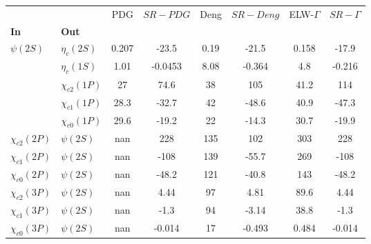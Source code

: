 \begin{tabular}{l|l|c|c|c|c|c|c}
\toprule
                &            &   PDG & $SR-PDG$ &  Deng & $SR-Deng$ &  ELW-$\Gamma$ & $SR-\Gamma$ \\
\textbf{In} & \textbf{Out} &       &          &       &           &               &             \\
\midrule
\textbf{$\psi(2S)$} & \textbf{$\eta_{c}(2S)$} & 0.207 &    -23.5 &  0.19 &     -21.5 &         0.158 &       -17.9 \\
                & \textbf{$\eta_{c}(1S)$} &  1.01 &  -0.0453 &  8.08 &    -0.364 &           4.8 &      -0.216 \\
                & \textbf{$\chi_{c2}(1P)$} &    27 &     74.6 &    38 &       105 &          41.2 &         114 \\
                & \textbf{$\chi_{c1}(1P)$} &  28.3 &    -32.7 &    42 &     -48.6 &          40.9 &       -47.3 \\
                & \textbf{$\chi_{c0}(1P)$} &  29.6 &    -19.2 &    22 &     -14.3 &          30.7 &       -19.9 \\
\textbf{$\chi_{c2}(2P)$} & \textbf{$\psi(2S)$} &   nan &      228 &   135 &       102 &           303 &         228 \\
\textbf{$\chi_{c1}(2P)$} & \textbf{$\psi(2S)$} &   nan &     -108 &   139 &     -55.7 &           269 &        -108 \\
\textbf{$\chi_{c0}(2P)$} & \textbf{$\psi(2S)$} &   nan &    -48.2 &   121 &     -40.8 &           143 &       -48.2 \\
\textbf{$\chi_{c2}(3P)$} & \textbf{$\psi(2S)$} &   nan &     4.44 &    97 &      4.81 &          89.6 &        4.44 \\
\textbf{$\chi_{c1}(3P)$} & \textbf{$\psi(2S)$} &   nan &     -1.3 &    94 &     -3.14 &          38.8 &        -1.3 \\
\textbf{$\chi_{c0}(3P)$} & \textbf{$\psi(2S)$} &   nan &   -0.014 &    17 &    -0.493 &         0.484 &      -0.014 \\
\bottomrule
\end{tabular}
